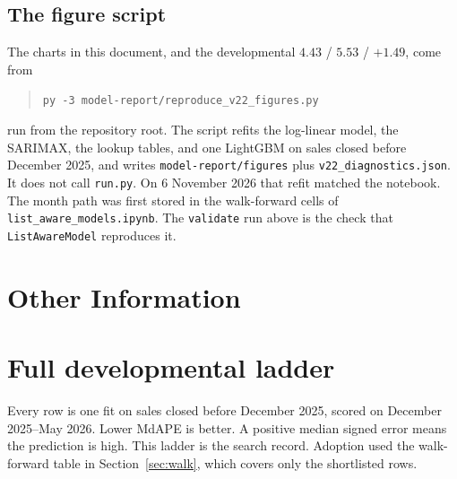 \documentclass[11pt]{article}
\begin{document}
\subsection{The figure script}

The charts in this document, and the developmental \(4.43\) / \(5.53\) / \(+1.49\), come from
\begin{quote}
\texttt{py -3 model-report/reproduce\_v22\_figures.py}
\end{quote}
run from the repository root. The script refits the log-linear model, the SARIMAX, the lookup tables, and one LightGBM on sales closed before December 2025, and writes \texttt{model-report/figures} plus \texttt{v22\_diagnostics.json}. It does not call \texttt{run.py}. On 6 November 2026 that refit matched the notebook. The month path was first stored in the walk-forward cells of \texttt{list\_aware\_models.ipynb}. The \texttt{validate} run above is the check that \texttt{ListAwareModel} reproduces it.

\section{Other Information}

\appendix
\section{Full developmental ladder}
\label{app:ladder}

Every row is one fit on sales closed before December 2025, scored on December 2025--May 2026. Lower MdAPE is better. A positive median signed error means the prediction is high. This ladder is the search record. Adoption used the walk-forward table in Section~\ref{sec:walk}, which covers only the shortlisted rows.
\end{document}
